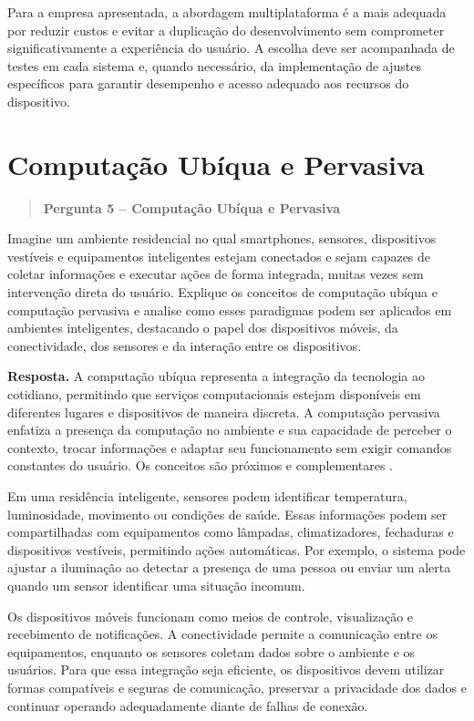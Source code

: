 \documentclass[
    12pt,
    oneside,
    a4paper,
    brazil
]{abntex2}
\newcommand{\pergunta}[2]{%
\begin{quote}
\noindent\textbf{Pergunta #1 -- #2}
\end{quote}}
\newcommand{\resposta}{%
\par\noindent\textbf{Resposta.}\hspace{0.3em}
}
\begin{document}
Para a empresa apresentada, a abordagem multiplataforma é a mais adequada por reduzir custos e evitar a duplicação do desenvolvimento sem comprometer significativamente a experiência do usuário. A escolha deve ser acompanhada de testes em cada sistema e, quando necessário, da implementação de ajustes específicos para garantir desempenho e acesso adequado aos recursos do dispositivo.

\section{Computação Ubíqua e Pervasiva}
\pergunta{5}{Computação Ubíqua e Pervasiva}

Imagine um ambiente residencial no qual smartphones, sensores, dispositivos vestíveis e equipamentos inteligentes estejam conectados e sejam capazes de coletar informações e executar ações de forma integrada, muitas vezes sem intervenção direta do usuário. Explique os conceitos de computação ubíqua e computação pervasiva e analise como esses paradigmas podem ser aplicados em ambientes inteligentes, destacando o papel dos dispositivos móveis, da conectividade, dos sensores e da interação entre os dispositivos.

\resposta A computação ubíqua representa a integração da tecnologia ao cotidiano, permitindo que serviços computacionais estejam disponíveis em diferentes lugares e dispositivos de maneira discreta. A computação pervasiva enfatiza a presença da computação no ambiente e sua capacidade de perceber o contexto, trocar informações e adaptar seu funcionamento sem exigir comandos constantes do usuário. Os conceitos são próximos e complementares \cite{satyanarayanan2001}.

Em uma residência inteligente, sensores podem identificar temperatura, luminosidade, movimento ou condições de saúde. Essas informações podem ser compartilhadas com equipamentos como lâmpadas, climatizadores, fechaduras e dispositivos vestíveis, permitindo ações automáticas. Por exemplo, o sistema pode ajustar a iluminação ao detectar a presença de uma pessoa ou enviar um alerta quando um sensor identificar uma situação incomum.

Os dispositivos móveis funcionam como meios de controle, visualização e recebimento de notificações. A conectividade permite a comunicação entre os equipamentos, enquanto os sensores coletam dados sobre o ambiente e os usuários. Para que essa integração seja eficiente, os dispositivos devem utilizar formas compatíveis e seguras de comunicação, preservar a privacidade dos dados e continuar operando adequadamente diante de falhas de conexão.
\end{document}
